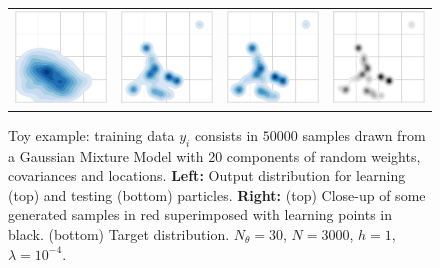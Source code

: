 \begin{figure}
\begin{centering}
\begin{tabular}{ccc|c}
\includegraphics[width=3cm]{figures/toy_load/output_dist_k=1-crop.pdf} & \includegraphics[width=3cm]{figures/toy_load/output_dist_k=20-crop.pdf} & \includegraphics[width=3cm]{figures/toy_load/output_dist_k=70-crop.pdf} &  \includegraphics[width=3cm]{figures/target-crop.pdf}\tabularnewline
\end{tabular}
\par\end{centering}
\caption{Toy example: training data $y_i$ consists in $50 000$ samples drawn from a Gaussian Mixture Model with $20$ components of random weights, covariances and locations. \textbf{Left:} Output distribution for learning (top) and testing (bottom) particles. \textbf{Right:} (top) Close-up of some generated samples in red superimposed with learning points in black. (bottom) Target distribution. $N_\theta=30$, $N=3000$, $h=1$, $\lambda=10^{-4}$.\label{fig:toy_example}}
\end{figure}



